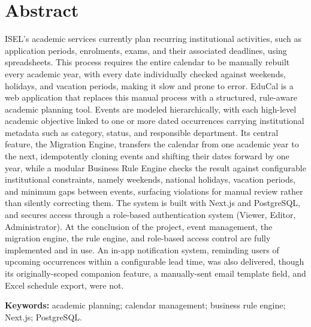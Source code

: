 \documentclass[a4paper,openright,twoside,11pt]{report}
\begin{document}
\chapter*{Abstract}
ISEL's academic services currently plan recurring institutional activities, such as application periods, enrolments, exams, and their associated deadlines, using spreadsheets. This process requires the entire calendar to be manually rebuilt every academic year, with every date individually checked against weekends, holidays, and vacation periods, making it slow and prone to error. EduCal is a web application that replaces this manual process with a structured, rule-aware academic planning tool. Events are modeled hierarchically, with each high-level academic objective linked to one or more dated occurrences carrying institutional metadata such as category, status, and responsible department. Its central feature, the Migration Engine, transfers the calendar from one academic year to the next, idempotently cloning events and shifting their dates forward by one year, while a modular Business Rule Engine checks the result against configurable institutional constraints, namely weekends, national holidays, vacation periods, and minimum gaps between events, surfacing violations for manual review rather than silently correcting them. The system is built with Next.js and PostgreSQL, and secures access through a role-based authentication system (Viewer, Editor, Administrator). At the conclusion of the project, event management, the migration engine, the rule engine, and role-based access control are fully implemented and in use. An in-app notification system, reminding users of upcoming occurrences within a configurable lead time, was also delivered, though its originally-scoped companion feature, a manually-sent email template field, and Excel schedule export, were not.

\textbf{Keywords:} academic planning; calendar management; business rule engine; Next.js; PostgreSQL.

\cleardoublepage
\end{document}

